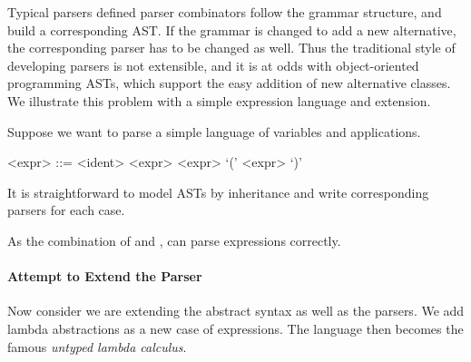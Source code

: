 
Typical parsers defined parser combinators follow the grammar
structure, and build a corresponding AST. If the grammar is changed to
add a new alternative, the corresponding parser has to be changed as
well. Thus the traditional style of developing parsers is not
extensible, and it is at odds with object-oriented programming ASTs,
which support the easy addition of new alternative classes. We
illustrate this problem with a simple expression language and extension.

Suppose we want to parse a simple language of variables and
applications.

\setlength{\grammarindent}{5em}
\begin{grammar}
<expr> ::= <ident>
    \alt <expr> <expr>
    \alt `(' <expr> `)'
\end{grammar}

It is straightforward to model ASTs by inheritance and write corresponding parsers for each case. 


As the combination of  and ,  can parse expressions correctly.

\paragraph{Attempt to Extend the Parser} Now consider we are extending the abstract syntax as well as the parsers. We add lambda abstractions as a new case of expressions. The language then becomes the famous \textit{untyped lambda calculus}.

